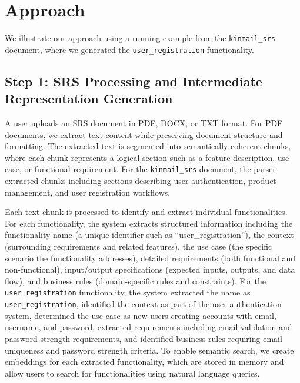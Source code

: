 \section{Approach}

We illustrate our approach using a running example from the \texttt{kinmail\_srs} document, where we generated the \texttt{user\_registration} functionality.

\subsection{Step 1: SRS Processing and Intermediate Representation Generation}

A user uploads an SRS document in PDF, DOCX, or TXT format. For PDF documents, we extract text content while preserving document structure and formatting. The extracted text is segmented into semantically coherent chunks, where each chunk represents a logical section such as a feature description, use case, or functional requirement. For the \texttt{kinmail\_srs} document, the parser extracted chunks including sections describing user authentication, product management, and user registration workflows.

Each text chunk is processed to identify and extract individual functionalities. For each functionality, the system extracts structured information including the functionality name (a unique identifier such as ``user\_registration''), the context (surrounding requirements and related features), the use case (the specific scenario the functionality addresses), detailed requirements (both functional and non-functional), input/output specifications (expected inputs, outputs, and data flow), and business rules (domain-specific rules and constraints). For the \texttt{user\_registration} functionality, the system extracted the name as \texttt{user\_registration}, identified the context as part of the user authentication system, determined the use case as new users creating accounts with email, username, and password, extracted requirements including email validation and password strength requirements, and identified business rules requiring email uniqueness and password strength criteria. To enable semantic search, we create embeddings for each extracted functionality, which are stored in memory and allow users to search for functionalities using natural language queries.

